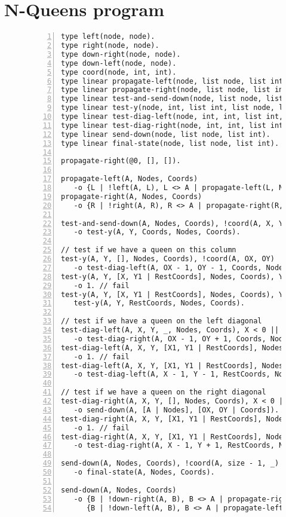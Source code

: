 
\section{N-Queens program}\label{code:nqueens}

\begin{figure}[h!]
\scriptsize\begin{Verbatim}[numbers=left]
type left(node, node).
type right(node, node).
type down-right(node, node).
type down-left(node, node).
type coord(node, int, int).
type linear propagate-left(node, list node, list int).
type linear propagate-right(node, list node, list int).
type linear test-and-send-down(node, list node, list int).
type linear test-y(node, int, list int, list node, list int).
type linear test-diag-left(node, int, int, list int, list node, list int).
type linear test-diag-right(node, int, int, list int, list node, list int).
type linear send-down(node, list node, list int).
type linear final-state(node, list node, list int).

propagate-right(@0, [], []).

propagate-left(A, Nodes, Coords)
   -o {L | !left(A, L), L <> A | propagate-left(L, Nodes, Coords)}, test-and-send-down(A, Nodes, Coords).
propagate-right(A, Nodes, Coords)
   -o {R | !right(A, R), R <> A | propagate-right(R, Nodes, Coords)}, test-and-send-down(A, Nodes, Coords).

test-and-send-down(A, Nodes, Coords), !coord(A, X, Y)
   -o test-y(A, Y, Coords, Nodes, Coords).

// test if we have a queen on this column
test-y(A, Y, [], Nodes, Coords), !coord(A, OX, OY)
   -o test-diag-left(A, OX - 1, OY - 1, Coords, Nodes, Coords).
test-y(A, Y, [X, Y1 | RestCoords], Nodes, Coords), Y = Y1
   -o 1. // fail
test-y(A, Y, [X, Y1 | RestCoords], Nodes, Coords), Y <> Y1 -o
   test-y(A, Y, RestCoords, Nodes, Coords).

// test if we have a queen on the left diagonal
test-diag-left(A, X, Y, _, Nodes, Coords), X < 0 || Y < 0, !coord(A, OX, OY)
   -o test-diag-right(A, OX - 1, OY + 1, Coords, Nodes, Coords).
test-diag-left(A, X, Y, [X1, Y1 | RestCoords], Nodes, Coords), X = X1, Y = Y1
   -o 1. // fail
test-diag-left(A, X, Y, [X1, Y1 | RestCoords], Nodes, Coords), X <> X1 || Y <> Y1
   -o test-diag-left(A, X - 1, Y - 1, RestCoords, Nodes, Coords).

// test if we have a queen on the right diagonal
test-diag-right(A, X, Y, [], Nodes, Coords), X < 0 || Y >= size, !coord(A, OX, OY)
   -o send-down(A, [A | Nodes], [OX, OY | Coords]). // add new queen
test-diag-right(A, X, Y, [X1, Y1 | RestCoords], Nodes, Coords), X = X1, Y = Y1
   -o 1. // fail
test-diag-right(A, X, Y, [X1, Y1 | RestCoords], Nodes, Coords), X <> X1 || Y <> Y1
   -o test-diag-right(A, X - 1, Y + 1, RestCoords, Nodes, Coords).

send-down(A, Nodes, Coords), !coord(A, size - 1, _)
   -o final-state(A, Nodes, Coords).

send-down(A, Nodes, Coords)
   -o {B | !down-right(A, B), B <> A | propagate-right(B, Nodes, Coords)},
      {B | !down-left(A, B), B <> A | propagate-left(B, Nodes, Coords)}.
\end{Verbatim}
\end{figure}
\normalsize

